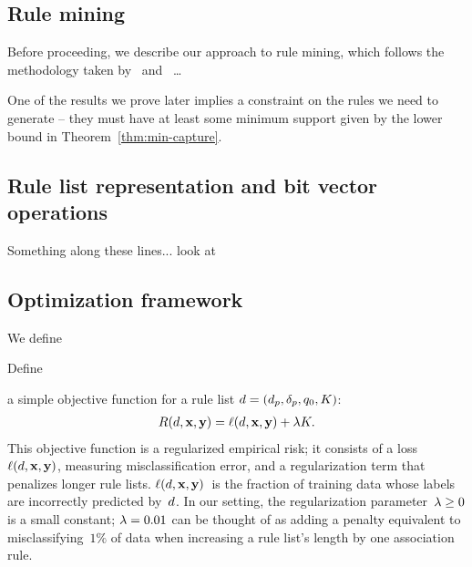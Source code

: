 \subsection{Rule mining}
\label{sec:rule-mining}

Before proceeding, we describe our approach to rule mining,
which follows the methodology taken by~\citet{LethamRuMcMa15}
and~\citet{YangRuSe16} \dots

One of the results we prove later implies a constraint on the rules
we need to generate -- they must have at least some minimum support
given by the lower bound in Theorem~\ref{thm:min-capture}.

\begin{arxiv}
\subsection{Rule list representation and bit vector operations}
Something along these lines... look at~\citet{YangRuSe16}
\end{arxiv}

\subsection{Optimization framework}

\begin{arxiv}
We define
\end{arxiv}
\begin{kdd}
Define
\end{kdd}
a simple objective function for a rule list ${{d} = (d_p, \delta_p, q_0, K)}$:
\begin{align}
\Obj(\RL, \x, \y) = \Loss(\RL, \x, \y) + \Reg K.
\label{eq:objective}
\end{align}
This objective function is a regularized empirical risk;
it consists of a loss~$\ell({d}, \mathbf{x}, \mathbf{y})$, measuring misclassification error,
and a regularization term that penalizes longer rule lists.
%
$\ell({d}, \mathbf{x}, \mathbf{y})$~is the fraction of training data whose labels are
incorrectly predicted by~${d}$.
%
In our setting, the regularization parameter~${{\lambda} \ge 0}$ is a small constant;
\eg ${{\lambda} = 0.01}$ can be thought of as adding a penalty equivalent to misclassifying~$1\%$
of data when increasing a rule list's length by one association rule.
%

